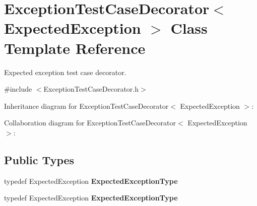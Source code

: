 \hypertarget{class_exception_test_case_decorator}{\section{Exception\+Test\+Case\+Decorator$<$ Expected\+Exception $>$ Class Template Reference}
\label{class_exception_test_case_decorator}
}


Expected exception test case decorator.  




{\ttfamily \#include $<$Exception\+Test\+Case\+Decorator.\+h$>$}



Inheritance diagram for Exception\+Test\+Case\+Decorator$<$ Expected\+Exception $>$\+:


Collaboration diagram for Exception\+Test\+Case\+Decorator$<$ Expected\+Exception $>$\+:
\subsection*{Public Types}
\begin{DoxyCompactItemize}
\item 
\hypertarget{class_exception_test_case_decorator_a3fc7e11a4aa1730fa98ff6ac52958ae9}{typedef Expected\+Exception {\bfseries Expected\+Exception\+Type}}\label{class_exception_test_case_decorator_a3fc7e11a4aa1730fa98ff6ac52958ae9}

\item 
\hypertarget{class_exception_test_case_decorator_a3fc7e11a4aa1730fa98ff6ac52958ae9}{typedef Expected\+Exception {\bfseries Expected\+Exception\+Type}}\label{class_exception_test_case_decorator_a3fc7e11a4aa1730fa98ff6ac52958ae9}

\end{DoxyCompactItemize}
